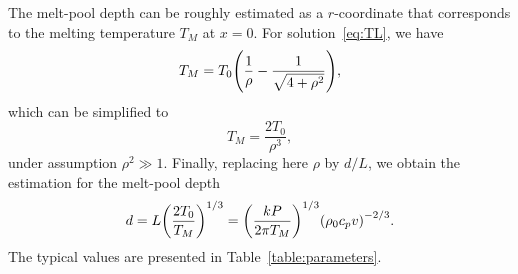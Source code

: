 \documentclass{article}
\begin{document}
The melt-pool depth can be roughly estimated as a $r$-coordinate
that corresponds to the melting temperature $T_M$ at $x=0$.
For solution~\eqref{eq:TL}, we have
\begin{equation}\label{eq:TL_r}
    T_M = T_0\qty( \frac1{\rho} - \frac1{\sqrt{4 +\rho^2}} ),
\end{equation}
which can be simplified to
\begin{equation}\label{eq:TL_r2}
    T_M = \frac{2T_0}{\rho^3},
\end{equation}
under assumption $\rho^2 \gg 1$.
Finally, replacing here $\rho$ by $d/L$, we obtain the estimation for the melt-pool depth
\begin{equation}\label{eq:depth}
    d = L\qty(\frac{2T_0}{T_M})^{1/3} = \qty(\frac{kP}{2\pi T_M})^{1/3}\qty(\rho_0 c_p v)^{-2/3}.
\end{equation}
The typical values are presented in Table~\ref{table:parameters}.

\printbibliography
\end{document}
